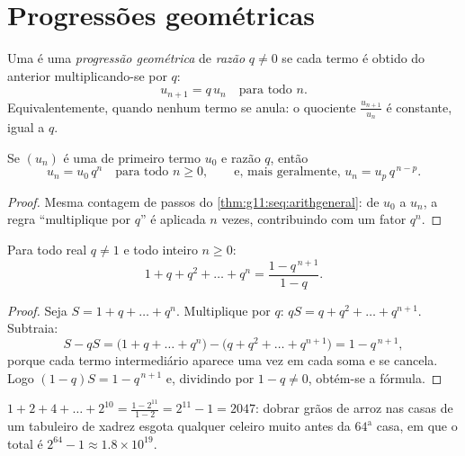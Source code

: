 \section{Progressões geométricas}

\begin{definition}\label{def:g11:seq:geometric}
Uma  é uma \emph{progressão geométrica} de \emph{razão} $q \neq 0$ se cada termo é
obtido do anterior multiplicando-se por $q$:
\[
u_{n+1} = q\,u_n \quad \text{para todo } n.
\]
Equivalentemente, quando nenhum termo se anula: o quociente
$\frac{u_{n+1}}{u_n}$ é constante, igual a $q$.
\end{definition}

\begin{theorem}\label{thm:g11:seq:geomgeneral}
Se $(u_n)$ é uma  de primeiro termo $u_0$ e razão
$q$, então
\[
u_n = u_0\, q^n \quad \text{para todo } n \geq 0,
\qquad\text{e, mais geralmente, } u_n = u_p\, q^{\,n-p} .
\]
\end{theorem}

\begin{proof}
Mesma contagem de passos do \cref{thm:g11:seq:arithgeneral}: de $u_0$ a
$u_n$, a regra ``multiplique por $q$'' é aplicada $n$ vezes, contribuindo
com um fator $q^n$.
\end{proof}

\begin{theorem}\label{thm:g11:seq:geomsum}
Para todo real $q \neq 1$ e todo inteiro $n \geq 0$:
\[
1 + q + q^2 + \dots + q^n = \frac{1 - q^{\,n+1}}{1 - q}.
\]
\end{theorem}

\begin{proof}
Seja $S = 1 + q + \dots + q^n$. Multiplique por $q$:
$qS = q + q^2 + \dots + q^{n+1}$. Subtraia:
\[
S - qS = \bigl(1 + q + \dots + q^n\bigr)
- \bigl(q + q^2 + \dots + q^{n+1}\bigr) = 1 - q^{\,n+1},
\]
porque cada termo intermediário aparece uma vez em cada soma e se
cancela. Logo $(1 - q)S = 1 - q^{\,n+1}$ e, dividindo por
$1 - q \neq 0$, obtém-se a fórmula.
\end{proof}

\begin{example}\label{ex:g11:seq:chessboard}
$1 + 2 + 4 + \dots + 2^{10} = \frac{1 - 2^{11}}{1 - 2} = 2^{11} - 1 =
2047$: dobrar grãos de arroz nas casas de um tabuleiro de xadrez esgota
qualquer celeiro muito antes da $64^{\text{a}}$ casa, em que o total é
$2^{64} - 1 \approx 1.8 \times 10^{19}$.
\end{example}

